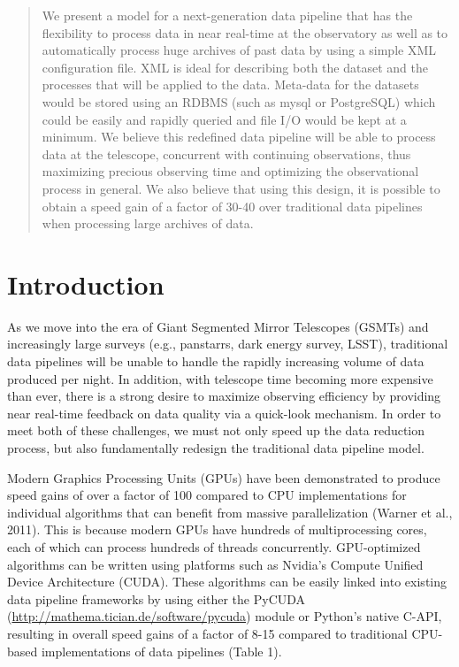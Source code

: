\begin{abstract}
We present a model for a next-generation data pipeline that has the flexibility to process data in near real-time at the observatory as well as to automatically process huge archives of past data by using a simple XML configuration file.  XML is ideal for describing both the dataset and the processes that will be applied to the data.  Meta-data for the datasets would be stored using an RDBMS (such as mysql or PostgreSQL) which could be easily and rapidly queried and file I/O would be kept at a minimum.  We believe this redefined data pipeline will be able to process data at the telescope, concurrent with continuing observations, thus maximizing precious observing time and optimizing the observational process in general.  We also believe that using this design, it is possible to obtain a speed gain of a factor of 30-40 over traditional data pipelines when processing large archives of data.
\end{abstract}

\section{Introduction}
As we move into the era of Giant Segmented Mirror Telescopes (GSMTs)
and increasingly large surveys (e.g., panstarrs, dark energy survey, LSST), 
traditional data pipelines will be unable to handle the rapidly increasing
volume of data produced per night.  In addition, with telescope time becoming
more expensive than ever, there is a strong desire to maximize observing
efficiency by providing near real-time feedback on data quality via a
quick-look mechanism.  In order to meet both of these challenges, we must
not only speed up the data reduction process, but also fundamentally
redesign the traditional data pipeline model.

Modern Graphics Processing Units (GPUs) have been demonstrated to produce
speed gains of over a factor of 100 compared to CPU implementations for
individual algorithms that can benefit from massive parallelization (Warner
et al., 2011).  This is because modern GPUs have hundreds of multiprocessing
cores, each of which can process hundreds of threads concurrently.
GPU-optimized algorithms can be written using platforms such as Nvidia's
Compute Unified Device Architecture (CUDA).  These algorithms can be easily
linked into existing data pipeline frameworks by using either the PyCUDA
(\url{http://mathema.tician.de/software/pycuda}) module or Python's native
C-API, resulting in overall speed gains of a factor of 8-15 compared to
traditional CPU-based implementations of data pipelines (Table 1).

